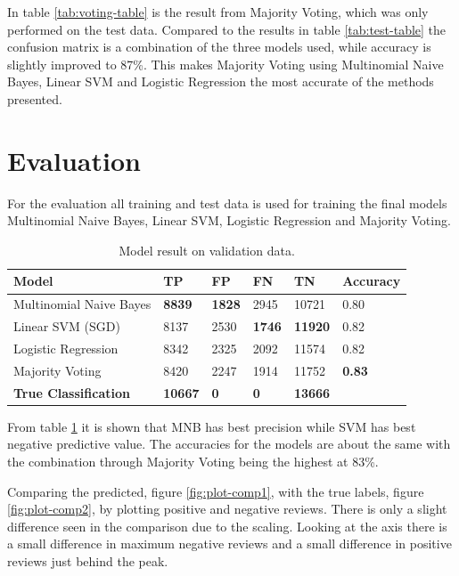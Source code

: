 In table \ref{tab:voting-table} is the result from Majority Voting, which was only performed on the test data. 
Compared to the results in table \ref{tab:test-table} the confusion matrix is a combination of the three models used, while accuracy is slightly improved to 87\%. 
This makes Majority Voting using Multinomial Naive Bayes, Linear SVM and Logistic Regression the most accurate of the methods presented. 


\section{Evaluation}
\label{sec:evaluation-result}

For the evaluation all training and test data is used for training the final models Multinomial Naive Bayes, Linear SVM, Logistic Regression and Majority Voting. 

\begin{table}[H]
    \centering
    \caption{Model result on validation data.}
    \label{tab:validation-table}
    \begin{tabular}{@{}llllll@{}}
    \toprule
    Model                        & TP             & FP            & FN            & TN             & Accuracy      \\ \midrule
    Multinomial Naive Bayes      & \textbf{8839}  & \textbf{1828} & 2945          & 10721          & 0.80          \\
    Linear SVM (SGD)             & 8137           & 2530          & \textbf{1746} & \textbf{11920} & 0.82          \\
    Logistic Regression          & 8342           & 2325          & 2092          & 11574          & 0.82          \\
    Majority Voting              & 8420           & 2247          & 1914          & 11752          & \textbf{0.83} \\ \midrule
    \textbf{True Classification} & \textbf{10667} & \textbf{0}    & \textbf{0}    & \textbf{13666} &              
    \end{tabular}
\end{table}

From table \ref{tab:validation-table} it is shown that MNB has best precision while SVM has best negative predictive value. 
The accuracies for the models are about the same with the combination through Majority Voting being the highest at 83\%.


Comparing the predicted, figure \ref{fig:plot-comp1}, with the true labels, figure \ref{fig:plot-comp2}, by plotting positive and negative reviews. 
There is only a slight difference seen in the comparison due to the scaling. 
Looking at the axis there is a small difference in maximum negative reviews and a small difference in positive reviews just behind the peak. 


